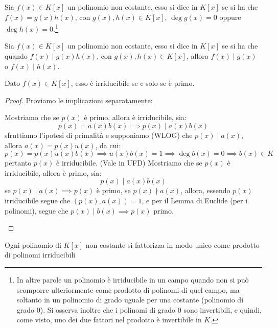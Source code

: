 \documentclass[11pt]{scrartcl}
\begin{document}
\begin{definition}
Sia $f(x) \in K[x]$ un polinomio non costante, esso si dice  in $K[x]$ se si ha che $f(x) = g(x)h(x)$, con $g(x), h(x) \in K[x]$, $\deg g(x) = 0$ oppure $\deg h(x) = 0$.\footnote{In altre parole un polinomio è irriducibile in un campo quando non si può scomporre ulteriormente come prodotto di polinomi di quel campo, ma soltanto in un polinomio di grado uguale per una costante (polinomio di grado $0$). Si osserva inoltre che i polinomi di grado 0 sono invertibili, e quindi, come visto, uno dei due fattori nel prodotto è invertibile in $K$.}
\end{definition}

\begin{definition}
Sia $f(x) \in K[x]$ un polinomio non costante, esso si dice  in $K[x]$ se si ha che quando $f(x) \mid g(x)h(x)$, con $g(x), h(x) \in K[x]$, allora $f(x) \mid g(x)$ o $f(x) \mid h(x)$.
\end{definition}

\begin{proposition}
Dato $f(x) \in K[x]$, esso è irriducibile se e solo se è primo.
\end{proposition}

\begin{proof}
Proviamo le implicazioni separatamente:
	\begin{itemize}
		\ii Mostriamo che se $p(x)$ è primo, allora è irriducibile, sia:
			\[ p(x) = a(x)b(x) \implies p(x) \mid a(x)b(x)
				\]
			sfruttiamo l'ipotesi di primalità e supponiamo (WLOG) che $p(x) \mid a(x)$, allora $a(x) = p(x)u(x)$, da cui:
			\[ p(x) = p(x)u(x)b(x) \implies u(x)b(x) = 1 \implies \deg b(x) = 0 \implies b(x) \in K
				\]
			pertanto $p(x)$ è irriducibile.
		\ii (Vale in UFD) Mostriamo che se $p(x)$ è irriducibile, allora è primo, sia:
			\[ p(x) \mid a(x)b(x)
				\]
			se $p(x) \mid a(x) \implies p(x)$ è primo, se $p(x) \nmid a(x)$, allora, essendo $p(x)$ irriducibile segue che
			$(p(x),a(x)) = 1$, e per il Lemma di Euclide (per i polinomi), segue che $p(x) \mid b(x) \implies p(x)$ primo.
	\end{itemize}
\end{proof}

\begin{theorem}
\label{p:fac}
Ogni polinomio di $K[x]$ non costante si fattorizza in modo unico come prodotto di polinomi irriducibili
\end{theorem}
\end{document}
